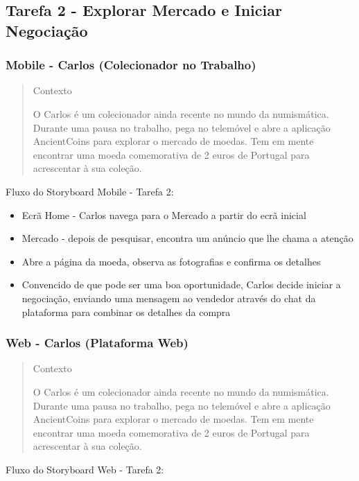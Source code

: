 \documentclass[12pt,a4paper]{article}
\begin{document}
\subsection{Tarefa 2 - Explorar Mercado e Iniciar Negociação}

\subsubsection{Mobile - Carlos (Colecionador no Trabalho)}

\begin{quote}
\small
Contexto\par
O Carlos é um colecionador ainda recente no mundo da numismática. Durante uma pausa no trabalho, pega no telemóvel e abre a aplicação AncientCoins para explorar o mercado de moedas. Tem em mente encontrar uma moeda comemorativa de 2 euros de Portugal para acrescentar à sua coleção.
\end{quote}

Fluxo do Storyboard Mobile - Tarefa 2:

\begin{itemize}
\setlength{\itemsep}{0.15em}
\item Ecrã Home - Carlos navega para o Mercado a partir do ecrã inicial
\item Mercado - depois de pesquisar, encontra um anúncio que lhe chama a atenção
\item Abre a página da moeda, observa as fotografias e confirma os detalhes
\item Convencido de que pode ser uma boa oportunidade, Carlos decide iniciar a negociação, enviando uma mensagem ao vendedor através do chat da plataforma para combinar os detalhes da compra
\end{itemize}

\subsubsection{Web - Carlos (Plataforma Web)}

\begin{quote}
\small
Contexto\par
O Carlos é um colecionador ainda recente no mundo da numismática. Durante uma pausa no trabalho, pega no telemóvel e abre a aplicação AncientCoins para explorar o mercado de moedas. Tem em mente encontrar uma moeda comemorativa de 2 euros de Portugal para acrescentar à sua coleção.
\end{quote}

Fluxo do Storyboard Web - Tarefa 2:
\end{document}

